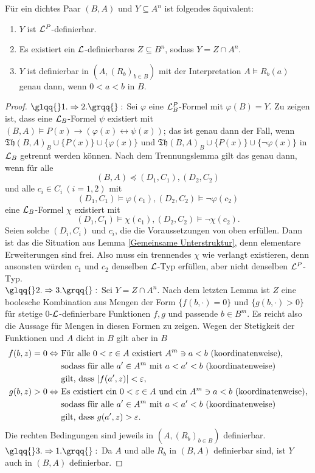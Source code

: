 \begin{theorem}\label{Definierbare Mengen}
	Für ein dichtes Paar $(B,A)$ und $Y\subseteq A^n$ ist folgendes äquivalent:
	\begin{enumerate}
		\item $Y$ ist $\mathcal{L}^P$-definierbar.
		\item Es existiert ein $\mathcal{L}$-definierbares $Z\subseteq B^n$, sodass $Y=Z\cap A^n$.
		\item $Y$ ist definierbar in $(A,(R_b)_{b\in B})$ mit der Interpretation $A\models R_b(a)$ genau dann, wenn $0<a<b$ in $B$.
	\end{enumerate}
\end{theorem}
\begin{proof}
	$\glqq{}1.\Rightarrow 2.\grqq{}:$ Sei $\varphi$ eine $\mathcal{L}^P_B$-Formel mit $\varphi(B)=Y$. Zu zeigen ist, dass eine $\mathcal{L}_B$-Formel $\psi$ existiert mit $(B,A)\models P(x)\rightarrow(\varphi(x)\leftrightarrow\psi(x))$; das ist genau dann der Fall, wenn $\mathfrak{Th}(B,A)_B\cup\{P(x)\}\cup\{\varphi(x)\}$ und $\mathfrak{Th}(B,A)_B\cup\{P(x)\}\cup\{\neg\varphi(x)\}$ in $\mathcal{L}_B$ getrennt werden können. Nach dem Trennungslemma gilt das genau dann, wenn für alle $$(B,A)\preceq(D_1,C_1),(D_2,C_2)$$ und alle $c_i\in C_i\ (i=1,2)$ mit $$(D_1,C_1)\models\varphi(c_1),(D_2,C_2)\models\neg\varphi(c_2)$$ eine $\mathcal{L}_B$-Formel $\chi$ existiert mit $$(D_1,C_1)\models\chi(c_1),(D_2,C_2)\models\neg\chi(c_2).$$
	Seien solche $(D_i,C_i)$ und $c_i$, die die Voraussetzungen von oben erfüllen. Dann ist das die Situation aus Lemma \ref{Gemeinsame Unterstruktur}, denn elementare Erweiterungen sind frei. Also muss ein trennendes $\chi$ wie verlangt existieren, denn ansonsten würden $c_1$ und $c_2$ denselben $\mathcal{L}$-Typ erfüllen, aber nicht denselben $\mathcal{L}^P$-Typ.\\
	$\glqq{}2.\Rightarrow 3.\grqq{}:$ Sei $Y=Z\cap A^n$. Nach dem letzten Lemma ist $Z$ eine boolesche Kombination aus Mengen der Form $\{f(b,\cdot)=0\}$ und $\{g(b,\cdot)>0\}$ für stetige 0-$\mathcal{L}$-definierbare Funktionen $f,g$ und passende $b\in B^m$. Es reicht also die Aussage für Mengen in diesen Formen zu zeigen. Wegen der Stetigkeit der Funktionen und $A$ dicht in $B$ gilt aber in $B$
	\begin{align*}
	f(b,z)=0\Leftrightarrow\ &\text{Für alle }0<\varepsilon\in A\text{ existiert }A^m\ni a<b\text{ (koordinatenweise),}\\&\text{sodass für alle }a'\in A^m\text{ mit }a<a'<b\text{ (koordinatenweise)}\\&\text{gilt, dass }{\left| f(a',z) \right|}<\varepsilon,\\
	g(b,z)>0\Leftrightarrow\ &\text{Es existiert ein }0<\varepsilon\in A\text{ und ein }A^m\ni a<b\text{ (koordinatenweise),}\\&\text{sodass für alle }a'\in A^m\text{ mit }a<a'<b\text{ (koordinatenweise)}\\&\text{gilt, dass }g(a',z)>\varepsilon.
	\end{align*}
	Die rechten Bedingungen sind jeweils in $(A,(R_b)_{b\in B})$ definierbar.\\
	$\glqq{}3.\Rightarrow 1.\grqq{}:$ Da $A$ und alle $R_b$ in $(B,A)$ definierbar sind, ist $Y$ auch in $(B,A)$ definierbar.
\end{proof}

